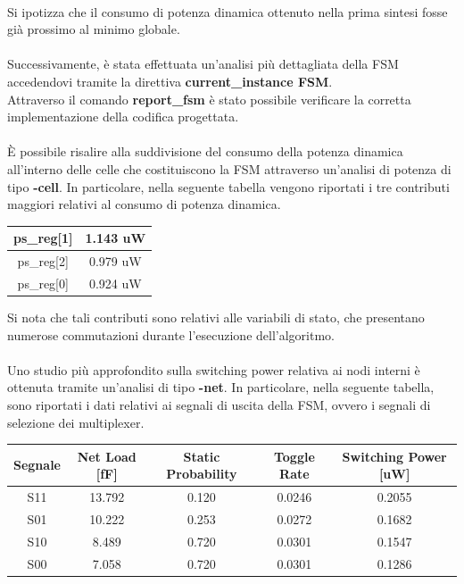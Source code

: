 \documentclass[11pt,  english, makeidx, a4paper, titlepage, oneside]{book}
\begin{document}
\\
Si ipotizza che il consumo di potenza dinamica ottenuto nella prima sintesi fosse già prossimo al minimo globale.
\\\\
Successivamente, è stata effettuata un'analisi più dettagliata della FSM accedendovi tramite la direttiva\textbf{ current\_instance FSM}.\\
Attraverso il comando \textbf{report\_fsm} è stato possibile verificare la corretta implementazione della codifica progettata.
\\\\
È possibile risalire alla suddivisione del consumo della potenza dinamica all'interno delle celle che costituiscono la FSM attraverso un'analisi di potenza di tipo \textbf{-cell}. In particolare, nella seguente tabella vengono riportati i tre contributi maggiori relativi al consumo di potenza dinamica.
\\
\begin{center}
	\begin{tabular}{|c|c|}
	\hline
	  ps\_reg[1] & 1.143 uW  \\
	\hline
	 ps\_reg[2] & 0.979 uW\\
	\hline
	ps\_reg[0] & 0.924 uW\\
	\hline
	\end{tabular}	
\end{center}
\vspace{0.3cm}
Si nota che tali contributi sono relativi alle variabili di stato, che presentano numerose commutazioni durante l'esecuzione dell'algoritmo.
\\\\
Uno studio più approfondito sulla switching power relativa ai nodi interni è ottenuta tramite un'analisi di tipo \textbf{-net}. In particolare, nella seguente tabella, sono riportati i dati relativi ai segnali di uscita della FSM, ovvero i segnali di selezione dei multiplexer.
\\
\begin{center}
	\begin{tabular}{|c|c|c|c|c|}
	\hline
	Segnale & Net Load [fF] & Static Probability & Toggle Rate & Switching Power [uW] \\
	\hline
	 S11 & 13.792  &  0.120  &  0.0246  & 0.2055 \\
	\hline
	 S01 & 10.222  &  0.253  &  0.0272  & 0.1682 \\
	\hline
	S10 & 8.489  &  0.720  &  0.0301  & 0.1547\\
	\hline
	S00 & 7.058  &  0.720  &  0.0301  & 0.1286 \\
	\hline
	\end{tabular}	
\end{center}
\end{document}
